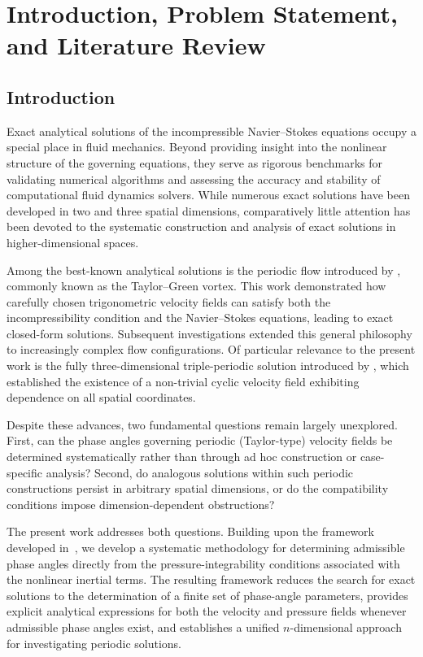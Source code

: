 \documentclass[11pt]{jfm}
\numberwithin{equation}{section}
\begin{document}
\section{Introduction, Problem Statement, and Literature Review}
\label{sec:intro}

\subsection{Introduction}

Exact analytical solutions of the incompressible Navier--Stokes equations occupy
a special place in fluid mechanics. Beyond providing insight into the nonlinear
structure of the governing equations, they serve as rigorous benchmarks for
validating numerical algorithms and assessing the accuracy and stability of
computational fluid dynamics solvers. While numerous exact solutions have been
developed in two and three spatial dimensions, comparatively little attention
has been devoted to the systematic construction and analysis of exact solutions
in higher-dimensional spaces.

Among the best-known analytical solutions is the periodic flow introduced by
\citet{tay}, commonly known as the Taylor--Green vortex. This work demonstrated how carefully chosen
trigonometric velocity fields can satisfy both the incompressibility condition
and the Navier--Stokes equations, leading to exact closed-form solutions.
Subsequent investigations extended this general philosophy to increasingly
complex flow configurations. Of particular relevance to the present work is the
fully three-dimensional triple-periodic solution introduced by
\citet{ant}, which established the existence of a non-trivial cyclic
velocity field exhibiting dependence on all spatial coordinates.

Despite these advances, two fundamental questions remain largely unexplored.
First, can the phase angles governing periodic (Taylor-type) velocity fields be
determined systematically rather than through ad hoc construction or
case-specific analysis? Second, do analogous solutions within such periodic
constructions persist in arbitrary spatial dimensions, or do the compatibility
conditions impose dimension-dependent obstructions?

The present work addresses both questions. Building upon the framework
developed in~\cite{tha4}, we develop a systematic methodology for determining
admissible phase angles directly from the pressure-integrability conditions
associated with the nonlinear inertial terms. The resulting framework reduces
the search for exact solutions to the determination of a finite set of
phase-angle parameters, provides explicit analytical expressions for both the
velocity and pressure fields whenever admissible phase angles exist, and
establishes a unified $n$-dimensional approach for investigating periodic solutions.
\end{document}
